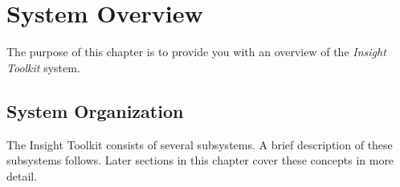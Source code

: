 \chapter{System Overview}
\label{chapter:SystemOverview}

The purpose of this chapter is to provide you with an overview of the
\emph{Insight Toolkit} system. 

\section{System Organization}
\label{sec:SystemOrganization}

The Insight Toolkit consists of several subsystems. A brief
description of these subsystems follows. Later sections in this chapter
cover these concepts in more detail. 

